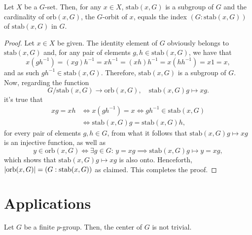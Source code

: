 \begin{proposition}\label{prop:cardinality-of-orbits}
  Let \(X\) be a \(G\)-set. Then, for any \(x\in{X}\), \(\text{stab}(x,G)\) is a subgroup
  of \(G\) and the cardinality of \(\text{orb}(x,G)\), the \(G\)-orbit of \(x\), equals the
  index \((G:\text{stab}(x,G))\) of \(\text{stab}(x,G)\) in \(G\).
\end{proposition}

\begin{proof}
  Let \(x\in{X}\) be given. The identity element of \(G\) obviously belongs to
  \(\text{stab}(x,G)\) and, for any pair of elements \(g,h\in{\text{stab}(x,G)}\), we have that
  \[
    x(gh^{-1})=(xg)h^{-1}=xh^{-1}=(xh)h^{-1}=x(hh^{-1})=x1=x,
  \]
  and as such \(gh^{-1}\in{\text{stab}(x,G)}\). Therefore, \(\text{stab}(x,G)\) is a subgroup of
  \(G\). Now, regarding the function
  \[
    G/\text{stab}(x,G)\to{\text{orb}(x,G)},
    \quad
    \text{stab}(x,G)g\mapsto{xg}.
  \]
  it's true that
  \begin{align*}
    xg=xh
    &\iff
    x(gh^{-1})=x
    \iff
    gh^{-1}\in{\text{stab}(x,G)}
    \\
    &\iff
    \text{stab}(x,G)g=\text{stab}(x,G)h,
  \end{align*}
  for every pair of elements \(g,h\in{G}\), from what it follows that
  \(\text{stab}(x,G)g\mapsto{xg}\) is an injective function, as well as
  \[
    y\in{\text{orb}(x,G)}
    \iff
    \exists{g\in{G}}:\,
    y=xg
    \implies
    \text{stab}(x,G)g\mapsto{y=xg},
  \]
  which shows that \(\text{stab}(x,G)g\mapsto{xg}\) is also onto. Henceforth,
  \(\lvert\text{orb}(x,G)\rvert=(G:\text{stab}(x,G))\) as claimed. This completes the proof.
\end{proof}

\section{Applications}\label{sec:applications}

\begin{proposition}\label{prop:class-equation}
  Let \(G\) be a finite \(p\)-group. Then, the center of \(G\) is not trivial.
\end{proposition}

